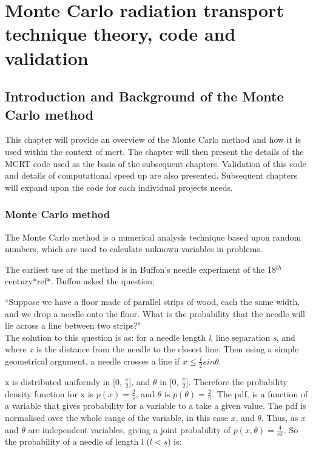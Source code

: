 \chapter{Monte Carlo radiation transport technique theory, code and validation}

\section{Introduction and Background of the Monte Carlo method}
This chapter will provide an overview of the Monte Carlo method and how it is used within the context of \gls{mcrt}. The chapter will then present the details of the MCRT code used as the basis of the subsequent chapters. Validation of this code and details of computational speed up are also presented. Subsequent chapters will expand upon the code for each individual projects needs.

\subsection{Monte Carlo method}
The Monte Carlo method is a numerical analysis technique based upon random numbers, which are used to calculate unknown variables in problems. 

The earliest use of the method is in Buffon's needle experiment of the 18$^{th}$ century*ref*. Buffon asked the question;


``Suppose we have a floor made of parallel strips of wood, each the same width, and we drop a needle onto the floor. What is the probability that the needle will lie across a line between two strips?"
\\

The solution to this question is as:
for a needle length \textit{l}, line separation \textit{s}, and where \textit{x} is the distance from the needle to the closest line. Then using a simple geometrical argument, a needle crosses a line if $x \leq \tfrac{l}{2} sin \theta$.

x is distributed uniformly in [0, $\tfrac{s}{2}$], and $\theta$ in [0, $\tfrac{\pi}{2}$]. Therefore the probability density function for x is $p(x)=\tfrac{2}{s}$, and $\theta$ is $p(\theta) = \tfrac{2}{\pi}$. The \gls{pdf}, is a function of a variable that gives probability for a variable to a take a given value. The \gls{pdf} is normalised over the whole range of the variable, in this case $x$, and $\theta$.
Thus, as \textit{x} and $\theta$ are independent variables, giving a joint probability of $p(x,\theta) = \tfrac{4}{s \pi}$.
So the probability of a needle of length l ($l<s$) is:

